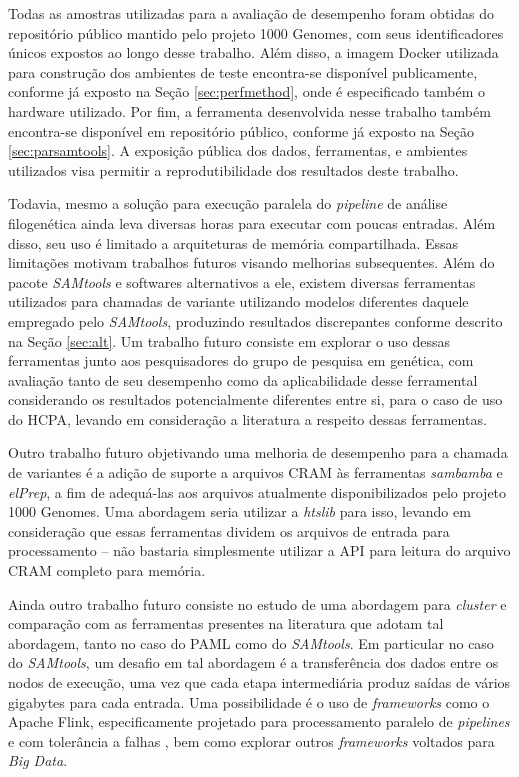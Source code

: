 \documentclass[cic,tc]{iiufrgs}
\begin{document}
Todas as amostras utilizadas para a avaliação de desempenho foram obtidas do
repositório público mantido pelo projeto 1000 Genomes, com seus identificadores
únicos expostos ao longo desse trabalho. Além disso, a imagem Docker utilizada
para construção dos ambientes de teste encontra-se disponível publicamente,
conforme já exposto na Seção \ref{sec:perfmethod}, onde é especificado também o
hardware utilizado. Por fim, a ferramenta desenvolvida nesse trabalho também
encontra-se disponível em repositório público, conforme já exposto na Seção
\ref{sec:parsamtools}. A exposição pública dos dados, ferramentas, e ambientes
utilizados visa permitir a reprodutibilidade dos resultados deste trabalho.

Todavia, mesmo a solução para execução paralela do \textit{pipeline} de análise
filogenética ainda leva diversas horas para executar com poucas entradas. Além
disso, seu uso é limitado a arquiteturas de memória compartilhada. Essas
limitações motivam trabalhos futuros visando melhorias subsequentes. Além do
pacote \textit{SAMtools} e softwares alternativos a ele, existem diversas
ferramentas utilizados para chamadas de variante utilizando modelos diferentes
daquele empregado pelo \textit{SAMtools}, produzindo resultados discrepantes
conforme descrito na Seção \ref{sec:alt}. Um trabalho futuro consiste em
explorar o uso dessas ferramentas junto aos pesquisadores do grupo de pesquisa
em genética, com avaliação tanto de seu desempenho como da aplicabilidade desse
ferramental considerando os resultados potencialmente diferentes entre si, para
o caso de uso do HCPA, levando em consideração a literatura a respeito dessas
ferramentas.

Outro trabalho futuro objetivando uma melhoria de desempenho para a chamada de
variantes é a adição de suporte a arquivos CRAM às ferramentas
\textit{sambamba} e \textit{elPrep}, a fim de adequá-las aos arquivos
atualmente disponibilizados pelo projeto 1000 Genomes. Uma abordagem seria
utilizar a \textit{htslib} para isso, levando em consideração que essas ferramentas
dividem os arquivos de entrada para processamento -- não bastaria simplesmente
utilizar a API para leitura do arquivo CRAM completo para memória.

Ainda outro trabalho futuro consiste no estudo de uma abordagem para
\textit{cluster} e comparação com as ferramentas presentes na literatura que
adotam tal abordagem, tanto no caso do PAML como do \textit{SAMtools}. Em particular no
caso do \textit{SAMtools}, um desafio em tal abordagem é a transferência dos dados entre
os nodos de execução, uma vez que cada etapa intermediária produz saídas de
vários gigabytes para cada entrada. Uma possibilidade é o uso de
\textit{frameworks} como o Apache Flink, especificamente projetado para processamento
paralelo de \textit{pipelines} e com tolerância a falhas
\cite{carbone2015apache}, bem como explorar outros \textit{frameworks} voltados
para \textit{Big Data}.
\end{document}
